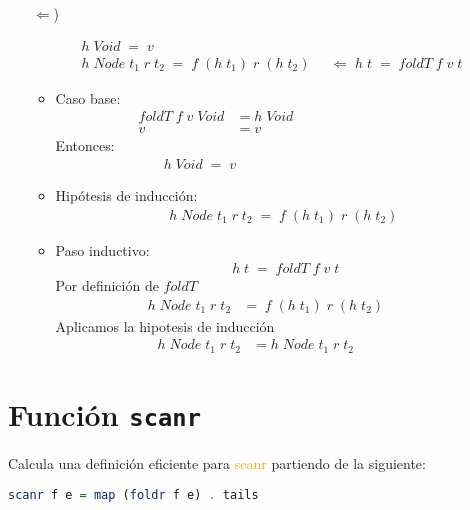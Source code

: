 \documentclass[spanish,12pt,letterpaper]{article}
\begin{document}
\begin{enumerate}
\begin{itemize}
\begin{itemize}
\item[$\Leftarrow$)]

\begin{align*}
h\;Void\; = \;v \qquad \qquad \qquad \qquad \;\;\;\;\;\;\\
h\;Node\;t_1\;r\;t_2\;=\;f\;(h\;t_1)\;r\;(h\;t_2)\;&\;\Leftarrow\;h\;t\;=\;foldT\;f\;v\;t
\end{align*}

\begin{itemize}
\item Caso base:\\
	\begin{align*}
	foldT\;f\;v\;Void &=h\;Void \qquad\qquad\qquad \\
	v &= v \qquad\qquad\qquad\qquad\qquad\qquad
	\end{align*}
	Entonces:
	\begin{align*}
	h\;Void\; = \;v \qquad\qquad\qquad\qquad\qquad\qquad
	\end{align*}

\item Hipótesis de inducción:
	\begin{align*}
	h\;Node\;t_1\;r\;t_2\;=\;f\;(h\;t_1)\;r\;(h\;t_2)
	\end{align*}
\item Paso inductivo:
\begin{align*}
\;h\;t\;=\;foldT\;f\;v\;t
\end{align*}
Por definición de $foldT$
\begin{align*}
h\;Node\;t_1\;r\;t_2&=\;f\;(h\;t_1)\;r\;(h\;t_2)\qquad\;\;
\end{align*}
Aplicamos la hipotesis de inducción
\begin{align*}
h\;Node\;t_1\;r\;t_2&=h\;Node\;t_1\;r\;t_2\qquad\qquad
\end{align*}
\end{itemize}

\end{itemize}
\end{itemize}
\end{enumerate}

\section{Función \texttt{scanr}}
Calcula una definición eficiente para \textcolor{orange}{scanr} partiendo de la
siguiente:

\begin{lstlisting}[language=Haskell]
  scanr f e = map (foldr f e) . tails
\end{lstlisting}
\end{document}
